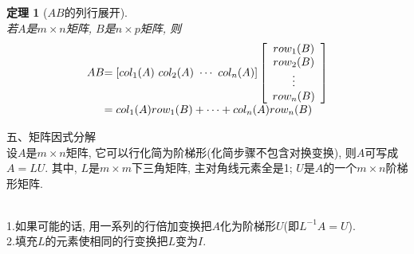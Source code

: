 \documentclass[UTF8,fontset=ubuntu]{ctexart}
\theoremstyle{plain}
\newtheorem{theorem}{定理}
\theoremstyle{nonumberplain}
\theoremstyle{empty}
\begin{document}
\begin{theorem}[$AB$的列行展开]\ \\
若$A$是$m\times n$矩阵, $B$是$n\times p$矩阵, 则
\[\begin{array}{l@{}l}
AB & =[col_1(A)\ col_2(A)\ \cdots\ col_n(A)]\left[
\begin{array}{c}
row_1(B)\\
row_2(B)\\
\vdots\\
row_n(B)
\end{array}
\right]\\
& =col_1(A)row_1(B)+\cdots+col_n(A)row_n(B)
\end{array}\]
\end{theorem}\vspace{8ex}

五、矩阵因式分解\\[1ex]
设$A$是$m\times n$矩阵, 它可以行化简为阶梯形(化简步骤不包含对换变换), 则$A$可写成$A=LU$. 其中, $L$是$m\times m$下三角矩阵, 主对角线元素全是1; $U$是$A$的一个$m\times n$阶梯形矩阵.\\[2ex]

\begin{law}[$LU$分解的算法]\ \\
1.如果可能的话, 用一系列的行倍加变换把$A$化为阶梯形$U$(即$L^{-1}A=U$).\\
2.填充$L$的元素使相同的行变换把$L$变为$I$.
\end{law}\vspace{4ex}
\end{document}
